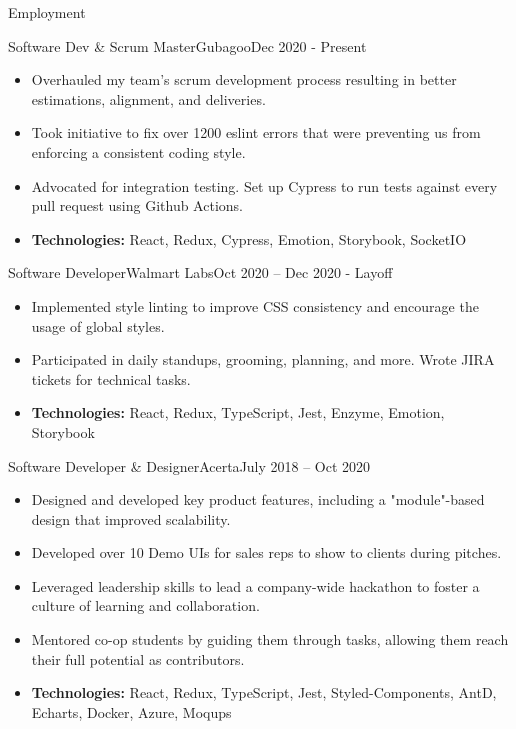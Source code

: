 \documentclass[]{mcdowellcv}
\begin{document}
	\begin{cvsection}{Employment}
		\begin{cvsubsection}{Software Dev \& Scrum Master}{Gubagoo}{Dec 2020 - Present}
 			\begin{itemize}
				\item Overhauled my team's scrum development process resulting in better estimations, alignment, and deliveries.
				\item Took initiative to fix over 1200 eslint errors that were preventing us from enforcing a consistent coding style.
				\item Advocated for integration testing. Set up Cypress to run tests against every pull request using Github Actions.
				\item \textbf{Technologies:} React, Redux, Cypress, Emotion, Storybook, SocketIO
			\end{itemize}
		\end{cvsubsection}
		\begin{cvsubsection}{Software Developer}{Walmart Labs}{Oct 2020 -- Dec 2020 - Layoff}
			\begin{itemize}
				\item Implemented style linting to improve CSS consistency and encourage the usage of global styles.
				\item Participated in daily standups, grooming, planning, and more. Wrote JIRA tickets for technical tasks.
				\item \textbf{Technologies:} React, Redux, TypeScript, Jest, Enzyme, Emotion, Storybook
			\end{itemize}
		\end{cvsubsection}
		\begin{cvsubsection}{Software Developer \& Designer}{Acerta}{July 2018 -- Oct 2020}
			\begin{itemize}
				\item Designed and developed key product features, including a "module"-based design that improved scalability.
				\item Developed over 10 Demo UIs for sales reps to show to clients during pitches.
				\item Leveraged leadership skills to lead a company-wide hackathon to foster a culture of learning and collaboration.
				\item Mentored co-op students by guiding them through tasks, allowing them reach their full potential as contributors.
				\item \textbf{Technologies:} React, Redux, TypeScript, Jest, Styled-Components, AntD, Echarts, Docker, Azure, Moqups
			\end{itemize}
		\end{cvsubsection}


\end{cvsection}
\end{document}
